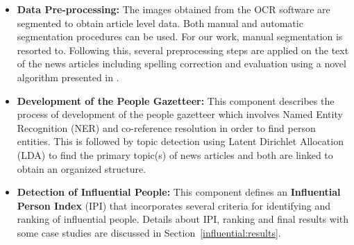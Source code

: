\begin{itemize}
\item \textbf{Data Pre-processing: } The images obtained from the OCR software are segmented to obtain article level data. Both manual and automatic segmentation procedures can be used. 
For our work, manual segmentation is resorted to.
Following this, several preprocessing steps are applied on the text of the news
articles including  spelling correction and evaluation using a novel algorithm presented in \cite{Gupta_14a}.


\item \textbf{Development of the People Gazetteer: }This component describes the process of development
of the people gazetteer which involves Named Entity Recognition (NER) and co-reference resolution in order to find person
entities. This is followed by topic detection using Latent Dirichlet Allocation (LDA) to find the primary topic(s) of news articles
and both are linked to obtain an organized structure.

\item \textbf{Detection of Influential People: } This component defines an \textbf{Influential Person Index}
(IPI) that incorporates several criteria for identifying and ranking of influential
people. Details about IPI, ranking and final results with some case studies are discussed in Section~\ref{influential:results}.
\end{itemize}